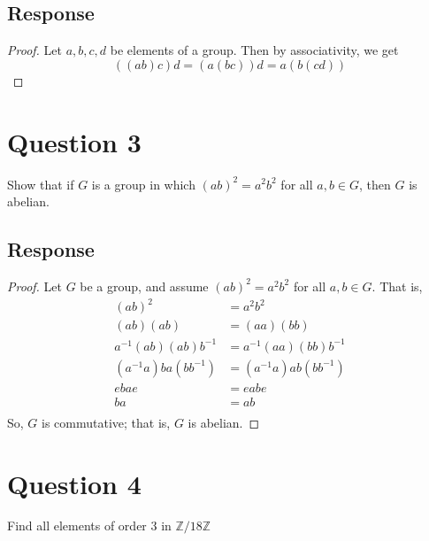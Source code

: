\documentclass[13pt]{article}
\begin{document}
\subsection*{Response}
\begin{proof}
  Let $a, b, c, d$ be elements of a group. Then by associativity, we get
  \[((ab)c)d = (a(bc))d = a(b(cd))\]
\end{proof}





\newpage
\section*{Question 3}
Show that if $G$ is a group in which $(ab)^2 = a^2b^2$ for all $a, b \in G$, then $G$ is abelian.

\subsection*{Response}
\begin{proof}
  Let $G$ be a group, and assume $(ab)^2 = a^2b^2$ for all $a, b \in G$. That is,
  \begin{align*}
    (ab)^2 &= a^2b^2 \\
    (ab)(ab) &= (aa)(bb) \\
    a^{-1}(ab)(ab)b^{-1} &= a^{-1}(aa)(bb)b^{-1} \\
    (a^{-1}a)ba(bb^{-1}) &= (a^{-1}a)ab(bb^{-1}) \\
    ebae &= eabe \\
    ba &= ab \\
  \end{align*}
  So, $G$ is commutative; that is, $G$ is abelian.
\end{proof}




\newpage
\section*{Question 4}
Find all elements of order 3 in $\mathbb{Z}/18\mathbb{Z}$
\end{document}
